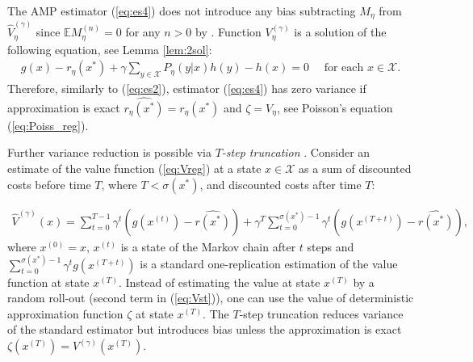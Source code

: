 \documentclass[11pt]{article}
\newcommand{\E}{\mathbb{E}}
\newcommand{\X}{\mathcal{X}}
\theoremstyle{definition}
\numberwithin{equation}{section}
\begin{document}
The AMP estimator (\ref{eq:es4}) does not introduce any bias subtracting $M_\eta$ from $\hat V^{(\gamma)}_\eta$ since    $\E M_{\eta}^{(n)} =0$ for any $n>0$ by \cite{Henderson2002}.
Function $V_{\eta}^{(\gamma)}$ is a solution of the following equation, see Lemma  \ref{lem:2sol}:
\begin{align}\label{eq:Poiss_reg}
g(x) - r_\eta(x^*) + \gamma\sum\limits_{y\in \X}P_\eta (y|x) h(y) - h(x) =0 \quad \text{ for each }x\in \X.
\end{align}
Therefore, similarly to (\ref{eq:es2}), estimator (\ref{eq:es4}) has zero variance if approximation is exact  $\widehat{r_\eta(x^*)} = r_\eta(x^*)$ and $\zeta = V _\eta$,  see Poisson's equation (\ref{eq:Poiss_reg}).

Further variance reduction is possible via \textit{$T$-step truncation} \cite[Section 6]{Sutton2018}. Consider an   estimate of  the value function  (\ref{eq:Vreg})  at a state $x\in \X$ as   a sum of discounted costs before time $T$, where $T<\sigma(x^*)$,   and discounted costs after time $T$:

\begin{align}\label{eq:Vst}
\hat V^{(\gamma)}(x) =  \sum\limits_{t=0}^{T-1} \gamma^t \left(g(x^{(t)})-\widehat{r(x^*)}\right) + \gamma^T\sum\limits_{t=0}^{\sigma(x^*)-1} \gamma^t \left(g(x^{(T+t)})-\widehat{r(x^*)}\right),
\end{align}
where   $ x^{(0)}=x$,  $x^{(t)}$ is a state of the Markov chain  after   $t$  steps and $\sum\limits_{t=0}^{\sigma(x^*)-1} \gamma^t g(x^{(T+t)})$ is a standard one-replication estimation of the value function at state $x^{(T)}$.
Instead of estimating the value at state $x^{(T)}$ by a random roll-out (second term in (\ref{eq:Vst})), one can use the value of deterministic approximation function $\zeta$ at state $x^{(T)}.$ The $T$-step truncation reduces variance of the standard estimator but introduces bias unless the approximation is exact $\zeta(x^{(T)}) =  V^{(\gamma)}(x^{(T)})$.
\end{document}
